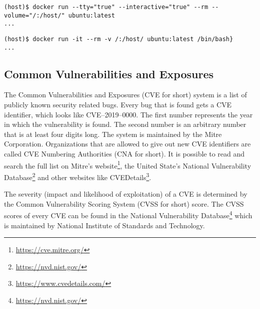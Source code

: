 \begin{lstlisting}[caption={Abbreviated non-quoted command example.}, captionpos=b, label={listing:notation:example3}]
(host)$ docker run --tty="true" --interactive="true" --rm --volume="/:/host/" ubuntu:latest
...
\end{lstlisting}

\begin{lstlisting}[caption={Non-abbreviated quoted command example.}, captionpos=b, label={listing:notation:example4}]
(host)$ docker run -it --rm -v /:/host/ ubuntu:latest /bin/bash}
...
\end{lstlisting}

\subsection*{Common Vulnerabilities and Exposures}
The Common Vulnerabilities and Exposures (CVE for short) system is a list of publicly known security related bugs. Every bug that is found gets a CVE identifier, which looks like CVE--2019--0000. The first number represents the year in which the vulnerability is found. The second number is an arbitrary number that is at least four digits long. The system is maintained by the Mitre Corporation. Organizations that are allowed to give out new CVE identifiers are called CVE Numbering Authorities (CNA for short). It is possible to read and search the full list on Mitre's website\footnote{\url{https://cve.mitre.org/}}, the United State's National Vulnerability Database\footnote{\url{https://nvd.nist.gov/}} and other websites like CVEDetails\footnote{\url{https://www.cvedetails.com/}}.

The severity (impact and likelihood of exploitation) of a CVE is determined by the Common Vulnerability Scoring System (CVSS for short) score. The CVSS scores of every CVE can be found in the National Vulnerability Database\footnote{\url{https://nvd.nist.gov/}} which is maintained by National Institute of Standards and Technology.
